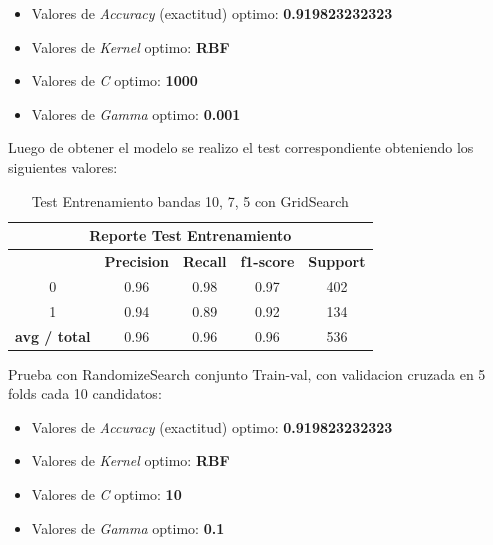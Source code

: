 \begin{itemize}
\item Valores de \textit{Accuracy} (exactitud) optimo: \textbf{0.919823232323}
\item Valores de \textit{Kernel} optimo: \textbf{RBF}
\item Valores de \textit{C} optimo: \textbf{1000}
\item Valores de \textit{Gamma} optimo: \textbf{0.001}
\end{itemize}

Luego de obtener el modelo se realizo el test correspondiente obteniendo los siguientes valores:
\begin{table}[H]
\begin{center}
\begin{tabular}{|c|c|c|c|c|}
\hline \multicolumn{5}{|c|}{Reporte Test Entrenamiento} \\ \hline
\hline \textbf{} & \textbf{Precision} & \textbf{Recall} & \textbf{f1-score} & \textbf{Support}\\ \hline 
				 0   & 0.96 & 0.98 & 0.97  & 402	\\ \hline 
				 1   & 0.94 & 0.89 & 0.92  & 134 \\ \hline 
\textbf{avg / total} & 0.96 & 0.96 & 0.96  & 536 \\ \hline
\end{tabular}
\end{center} \caption{Test Entrenamiento bandas 10, 7, 5 con GridSearch}\label{tab:gridsearchtest1075}
\end{table}


Prueba con RandomizeSearch conjunto Train-val, con validacion cruzada en 5 folds cada 10 candidatos:

\begin{itemize}
\item Valores de \textit{Accuracy} (exactitud) optimo: \textbf{0.919823232323}
\item Valores de \textit{Kernel} optimo: \textbf{RBF}
\item Valores de \textit{C} optimo: \textbf{10} 	
\item Valores de \textit{Gamma} optimo: \textbf{0.1}

\end{itemize}

